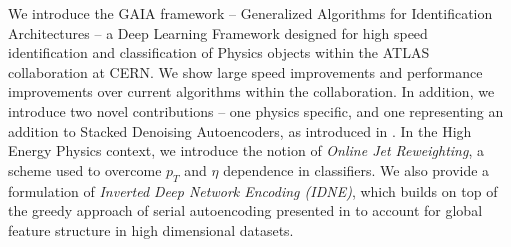 
We introduce the GAIA framework -- Generalized Algorithms for Identification Architectures -- a Deep Learning Framework designed for high speed identification and classification of Physics objects within the ATLAS collaboration at CERN. We show large speed improvements and performance improvements over current algorithms within the collaboration. In addition, we introduce two novel contributions -- one physics specific, and one representing an addition to Stacked Denoising Autoencoders, as introduced in \citet{Vincent2008}. In the High Energy Physics context, we introduce the notion of \textit{Online Jet Reweighting}, a scheme used to overcome $p_T$ and $\eta$ dependence in classifiers. We also provide a formulation of \textit{Inverted Deep Network Encoding (IDNE)}, which builds on top of the greedy approach of serial autoencoding presented in \citep{Vincent2008} to account for global feature structure in high dimensional datasets. 